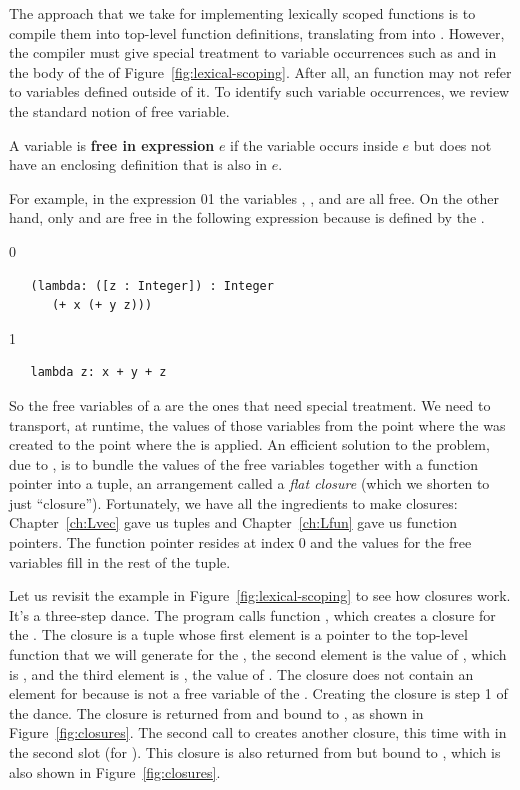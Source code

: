 \documentclass[7x10,nocrop]{TimesAPriori_MIT}%
\def\racketEd{0}
\def\pythonEd{1}
\def\edition{0}
\newcommand{\racket}[1]{{\if\edition\racketEd{#1}\fi}}
\newcommand{\python}[1]{{\if\edition\pythonEd #1\fi}}
\begin{document}
The approach that we take for implementing lexically scoped functions
is to compile them into top-level function definitions, translating
from \LangLam{} into \LangFun{}.  However, the compiler must give
special treatment to variable occurrences such as  and
 in the body of the  of
Figure~\ref{fig:lexical-scoping}. After all, an \LangFun{} function
may not refer to variables defined outside of it. To identify such
variable occurrences, we review the standard notion of free variable.

\begin{definition}
A variable is \textbf{free in expression} $e$ if the variable occurs
inside $e$ but does not have an enclosing definition that is also in
$e$.
\end{definition}

For example, in the expression
\racket{}\python{}
the variables , , and  are all free.  On the other hand,
only  and  are free in the following expression
because  is defined by the .
{\if\edition\racketEd
\begin{lstlisting}
   (lambda: ([z : Integer]) : Integer
      (+ x (+ y z)))
\end{lstlisting}
\fi}
{\if\edition\pythonEd
\begin{lstlisting}
   lambda z: x + y + z
\end{lstlisting}
\fi}
%
So the free variables of a  are the ones that need
special treatment. We need to transport, at runtime, the values of
those variables from the point where the  was created to
the point where the  is applied. An efficient solution to
the problem, due to \citet{Cardelli:1983aa}, is to bundle the values
of the free variables together with a function pointer into a tuple,
an arrangement called a \emph{flat closure} (which we shorten to just
``closure'').
%
Fortunately, we have all the ingredients to make closures:
Chapter~\ref{ch:Lvec} gave us tuples and Chapter~\ref{ch:Lfun} gave us
function pointers. The function pointer resides at index $0$ and the
values for the free variables fill in the rest of the tuple.

Let us revisit the example in Figure~\ref{fig:lexical-scoping} to see
how closures work. It's a three-step dance. The program calls function
, which creates a closure for the . The closure
is a tuple whose first element is a pointer to the top-level function
that we will generate for the , the second element is the
value of , which is , and the third element is
, the value of . The closure does not contain an
element for  because  is not a free variable of the
. Creating the closure is step 1 of the dance. The
closure is returned from  and bound to , as shown in
Figure~\ref{fig:closures}.
%
The second call to  creates another closure, this time with
 in the second slot (for ). This closure is also
returned from  but bound to , which is also shown in
Figure~\ref{fig:closures}.
\end{document}
